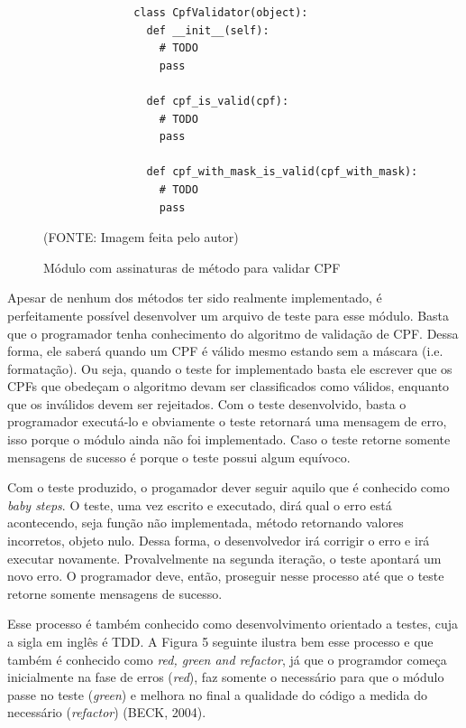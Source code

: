 \documentclass[
    12pt,       %
    openright,      %
    twoside,      %
    a4paper,      %
    english,      %
    french,       %
    spanish,      %
    brazil,       %
    ]{abntex2}
\begin{document}
      \begin{figure}[htpb]
          \begin{lstlisting}
              class CpfValidator(object):
                def __init__(self):
                  # TODO
                  pass

                def cpf_is_valid(cpf):
                  # TODO
                  pass

                def cpf_with_mask_is_valid(cpf_with_mask):
                  # TODO
                  pass
          \end{lstlisting}
          \caption{\label{fig:passaro}Módulo com assinaturas de método para validar CPF}\vspace{-1.2\baselineskip}
          \centering
          \begin{center}(FONTE: Imagem feita pelo autor)\end{center}
      \end{figure}

      Apesar de nenhum dos métodos ter sido realmente implementado, é perfeitamente
      possível desenvolver um arquivo de teste para esse módulo. Basta que o programador
      tenha conhecimento do algoritmo de validação de CPF. Dessa forma, ele saberá quando
      um CPF é válido mesmo estando sem a máscara (i.e. formatação). Ou seja, quando
      o teste for implementado basta ele escrever que os CPFs que obedeçam o algoritmo
      devam ser classificados como válidos, enquanto que os inválidos devem ser
      rejeitados. Com o teste desenvolvido, basta o programador executá-lo e
      obviamente o teste retornará uma mensagem de erro, isso porque o módulo ainda não
      foi implementado. Caso o teste retorne somente mensagens de sucesso é porque o
      teste possui algum equívoco.

      Com o teste produzido, o progamador dever seguir aquilo que é conhecido como
      \textit{baby steps}. O teste, uma vez escrito e executado, dirá qual o erro
      está acontecendo, seja função não implementada, método retornando valores
      incorretos, objeto nulo. Dessa forma, o desenvolvedor irá corrigir o erro e
      irá executar novamente. Provalvelmente na segunda iteração, o teste apontará
      um novo erro. O programador deve, então, proseguir nesse processo até que o
      teste retorne somente mensagens de sucesso.

      Esse processo é também conhecido como desenvolvimento orientado a testes, cuja
      a sigla em inglês é TDD. A Figura 5 seguinte ilustra bem esse processo e que
      também é conhecido como \textit{red, green and refactor}, já que o programdor
      começa inicialmente na fase de erros (\textit{red}), faz somente o necessário
      para que o módulo passe no teste (\textit{green}) e melhora no final a qualidade
      do código a medida do necessário (\textit{refactor}) (BECK, 2004).
\end{document}
